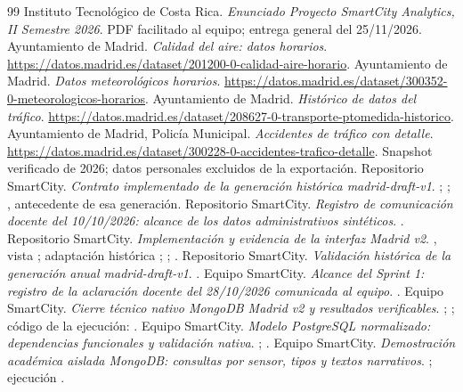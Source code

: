 \begin{thebibliography}{99}
 Instituto Tecnológico de Costa Rica.
\emph{Enunciado Proyecto SmartCity Analytics, II Semestre 2026}.
PDF facilitado al equipo; entrega general del 25/11/2026.
 Ayuntamiento de Madrid.
\emph{Calidad del aire: datos horarios}.
\url{https://datos.madrid.es/dataset/201200-0-calidad-aire-horario}.
 Ayuntamiento de Madrid.
\emph{Datos meteorológicos horarios}.
\url{https://datos.madrid.es/dataset/300352-0-meteorologicos-horarios}.
 Ayuntamiento de Madrid.
\emph{Histórico de datos del tráfico}.
\url{https://datos.madrid.es/dataset/208627-0-transporte-ptomedida-historico}.
 Ayuntamiento de Madrid, Policía Municipal.
\emph{Accidentes de tráfico con detalle}.
\url{https://datos.madrid.es/dataset/300228-0-accidentes-trafico-detalle}.
Snapshot verificado de 2026; datos personales excluidos de la exportación.
 Repositorio SmartCity.
\emph{Contrato implementado de la generación histórica madrid-draft-v1}.
;
;
, antecedente de esa generación.
 Repositorio SmartCity.
\emph{Registro de comunicación docente del 10/10/2026:
alcance de los datos administrativos sintéticos}.
.
 Repositorio SmartCity.
\emph{Implementación y evidencia de la interfaz Madrid v2}.
, vista
; adaptación histórica
;
;
.
 Repositorio SmartCity.
\emph{Validación histórica de la generación anual madrid-draft-v1}.
.
 Equipo SmartCity.
\emph{Alcance del Sprint 1: registro de la aclaración docente
del 28/10/2026 comunicada al equipo}.
.
 Equipo SmartCity.
\emph{Cierre técnico nativo MongoDB Madrid v2 y resultados verificables}.
;
;
código de la ejecución: .
 Equipo SmartCity.
\emph{Modelo PostgreSQL normalizado: dependencias funcionales y validación nativa}.
;
.
 Equipo SmartCity.
\emph{Demostración académica aislada MongoDB: consultas por sensor, tipos y textos narrativos}.
; ejecución
.
\end{thebibliography}
